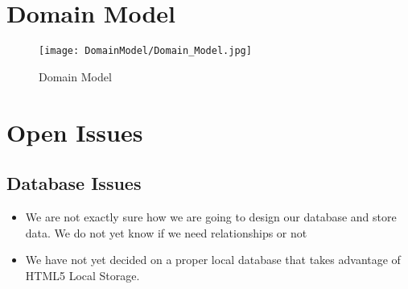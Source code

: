 \documentclass[11pt,fleqn]{book} %
\begin{document}

\chapter{Domain Model}
\begin{figure}
	\texttt{[image: DomainModel/Domain\_Model.jpg]}
	\caption{Domain Model}
\end{figure}
	
	


\chapter{Open Issues}

\section{Database Issues}
\begin{itemize}
	\item We are not exactly sure how we are going to design our database and store data. We do not yet know if we need relationships or not
	\item We have not yet decided on a proper local database that takes advantage of HTML5 Local Storage.
\end{itemize}
\end{document}
